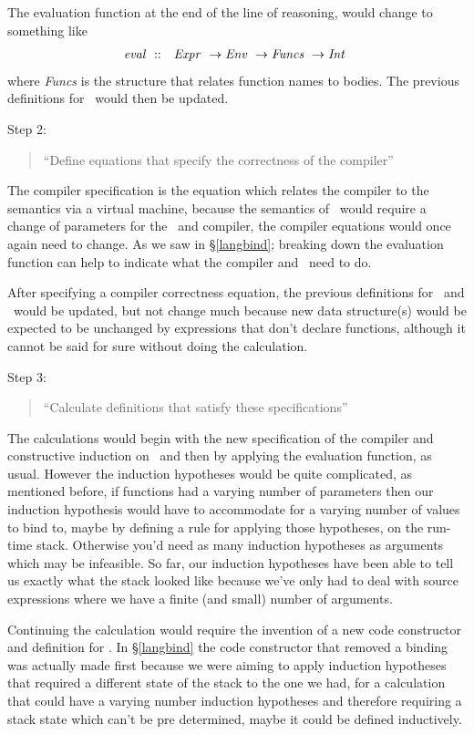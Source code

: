 \documentclass {article}
\begin{document}
The evaluation function at the end of the line of reasoning,
would change to something like
\begin{eqnarray*}
\mathit{eval\ } &::& \mathit{Expr\ } \rightarrow \mathit{Env\ }
			 \rightarrow \mathit{Funcs\ } \rightarrow \mathit{Int\ } 
\end{eqnarray*}
\noindent where \textit{Funcs} is the structure that relates
function names to bodies. The previous definitions for \eval\ 
would then be updated.

Step 2: 
\begin{quote}
``Define equations that specify the correctness of the compiler''
\end{quote}

The compiler specification is the equation which
relates the compiler to the semantics via a virtual machine\cite[pg 12]{bandh},
because the semantics of \deef\ would require a change of parameters
for the \vm\ and compiler, the compiler equations would once again
need to change.
As we saw in \S\ref{langbind};
breaking down the evaluation function
can help to indicate what the compiler
and \vm\ need to do.

After specifying a compiler correctness equation, the
previous definitions for \comp\ and \exec\ would be updated, 
but not change much because
new data structure(s) 
would be expected to be unchanged by expressions 
that don't declare functions, although it cannot be said
for sure without doing the calculation.

Step 3: 
\begin{quote}
``Calculate definitions that satisfy these specifications''
\end{quote}

The calculations would begin with the new specification of the compiler
and constructive induction on \deef\ and then by applying the 
evaluation function, as usual.
However the induction hypotheses would be quite complicated,
as mentioned before, if functions had a varying number
of parameters then our induction hypothesis would have to accommodate
for a varying number of values to bind to, maybe by defining a rule
for applying those hypotheses, on the run-time stack.
Otherwise you'd need as many induction hypotheses as arguments
which may be infeasible.
So far, our induction hypotheses have been able to tell us
exactly what the stack looked like because
 we've only had to deal with source expressions where we 
have a finite (and small) number of arguments.

Continuing the calculation would require the invention of a new 
code constructor and definition for \exec. In \S\ref{langbind}
the code constructor that removed a binding was actually made first
because we were aiming to apply induction hypotheses 
that required a different state of the stack to the one we had,
for a calculation that could have a varying number 
induction hypotheses and therefore requiring a stack state which
can't be pre determined, maybe it could be defined inductively.
\end{document}
